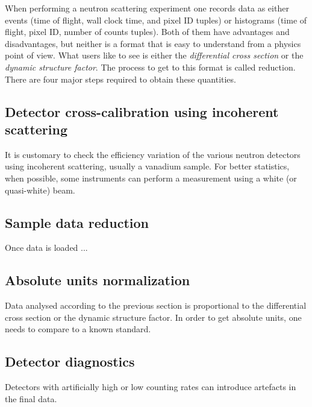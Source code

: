 When performing a neutron scattering experiment one records data as either events (time of flight, wall clock time, and pixel ID tuples) or histograms (time of flight, pixel ID, number of counts tuples). Both of them have advantages and disadvantages, but neither is a format that is easy to understand from a physics point of view. What users like to see is either the {\it differential cross section} or the {\it dynamic structure factor}. The process to get to this format is called reduction. 
There are four major steps required to obtain these quantities.
\subsection{Detector cross-calibration using incoherent scattering}
It is customary to check the efficiency variation of the various neutron detectors using incoherent scattering, usually a vanadium sample. For better statistics, when possible, some instruments can perform a measurement using a white (or quasi-white) beam.
\subsection{Sample data reduction} 
Once data is loaded ...
\subsection{Absolute units normalization}
Data analysed according to the previous section is proportional to the differential cross section or the dynamic structure factor. In order to get absolute units, one needs to compare to a known standard.
\subsection{Detector diagnostics}
Detectors with artificially high or low counting rates can introduce artefacts in the final data.